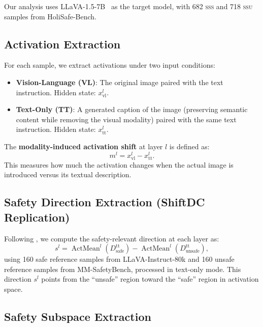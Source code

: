 \documentclass{article}
\newcommand{\ssu}{\textsc{ssu}}
\newcommand{\sss}{\textsc{sss}}
\begin{document}
Our analysis uses LLaVA-1.5-7B~\citep{liu2024visual} as the target model, with
682 \sss{} and 718 \ssu{} samples from HoliSafe-Bench.

\subsection{Activation Extraction}

For each sample, we extract activations under two input conditions:

\begin{itemize}
  \item \textbf{Vision-Language (VL)}: The original image paired with the text
        instruction.  Hidden state: $x^l_{\mathrm{vl}}$.
  \item \textbf{Text-Only (TT)}: A generated caption of the image (preserving
        semantic content while removing the visual modality) paired with the same
        text instruction.  Hidden state: $x^l_{\mathrm{tt}}$.
\end{itemize}

The \textbf{modality-induced activation shift} at layer $l$ is defined as:
\begin{equation}
  m^l = x^l_{\mathrm{vl}} - x^l_{\mathrm{tt}}.
  \label{eq:shift}
\end{equation}
This measures how much the activation changes when the actual image is introduced
versus its textual description.

\subsection{Safety Direction Extraction (ShiftDC Replication)}

Following \citet{zou2025shiftdc}, we compute the safety-relevant direction at
each layer as:
\begin{equation}
  s^l = \operatorname{ActMean}^l\!\left(D_{\mathrm{safe}}^{\mathrm{tt}}\right)
        - \operatorname{ActMean}^l\!\left(D_{\mathrm{unsafe}}^{\mathrm{tt}}\right),
  \label{eq:safety_dir}
\end{equation}
using 160 safe reference samples from LLaVA-Instruct-80k and 160 unsafe
reference samples from MM-SafetyBench, processed in text-only mode.  This
direction $s^l$ points from the ``unsafe'' region toward the ``safe'' region in
activation space.

\subsection{Safety Subspace Extraction}
\end{document}
